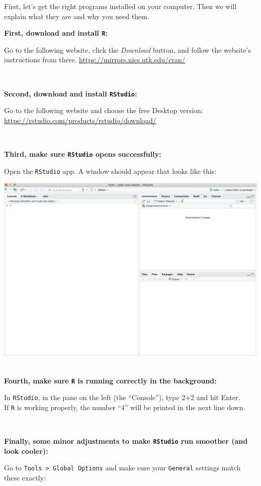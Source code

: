 \documentclass[
]{book}
\begin{document}
First, let's get the right programs installed on your computer. Then we will explain what they are and why you need them.

\textbf{First, download and install \texttt{R}: }

Go to the following website, click the \emph{Download} button, and follow the website's instructions from there.
\url{https://mirrors.nics.utk.edu/cran/}

~

\textbf{Second, download and install \texttt{RStudio}:}

Go to the following website and choose the free Desktop version:
\url{https://rstudio.com/products/rstudio/download/}

~

\textbf{Third, make sure \texttt{RStudio} opens successfully:}

Open the \texttt{RStudio} app. A window should appear that looks like this:

\includegraphics{img/rstudio_firstopen.png}
~

\textbf{Fourth, make sure \texttt{R} is running correctly in the background:}

In \texttt{RStudio}, in the pane on the left (the ``Console''), type 2+2 and hit Enter.\\
If \texttt{R} is working properly, the number ``4'' will be printed in the next line down.

~

\textbf{Finally, some minor adjustments to make \texttt{RStudio} run smoother (and look cooler):}

Go to \texttt{Tools\ \textgreater{}\ Global\ Options} and make sure your \texttt{General} settings match these exactly:
\end{document}
